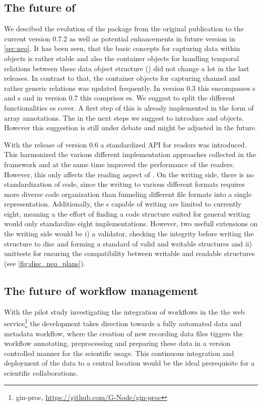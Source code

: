 \subsection{The future of }
We descibed the evolution of the  package from the original publication \cite{Garcia_2014} to the current version $0.7.2$ as well as potential enhancements in future version in \cref{sec:neo}. It has been seen, that the basic concepts for capturing data within  objects is rather stable and also the  container objects for handling temporal relations between these data object structure () did not change a lot in the last releases. In contrast to that, the container objects for capturing channel and rather generic relations was updated frequently. In  version $0.3$ this encompasses s and s and in  version 0.7 this comprises es. We suggest to split the different functionalities es cover. A first step of this is already implemented in the form of array annotations. The in the next steps we suggest to introduce  and  objects. However this suggestion is still under debate and might be adjusted in the future. 

With the release of  version $0.6$ a standardized API for readers was introduced. This harmonized the various different implementation approaches collected in the  framework and at the same time improved the performance of the readers. However, this only affects the reading aspect of . On the writing side, there is no standardization of code, since the writing to various different formats requires more diverse code organization than funneling different file formats into a single representation. Additionally, the s capable of writing are limited to currently eight, meaning a the effort of finding a code structure suited for general writing would only standardize eight implementations. However, two usefull extensions on the writing side would be i) a validator, checking the integrity before writing the  structure to disc and forming a standard of valid and writable  structures and ii) unittests for ensuring the compatibility between writable and readable  structures (see \cref{fig:disc_neo_plans}).

\subsection{The future of workflow management}
With the pilot study investigating the integration of  workflows in the the  web service\footnote{gin-proc, \url{https://github.com/G-Node/gin-proc}} the development takes direction towards a fully automated data and metadata workflow, where the creation of new recording data files tiggers the workflow annotating, preprocessing and preparing these data in a version controlled manner for the scientific usage. This continuous integration and deployment of the data to a central location would be the ideal prerequisite for a scientific collaborations.


